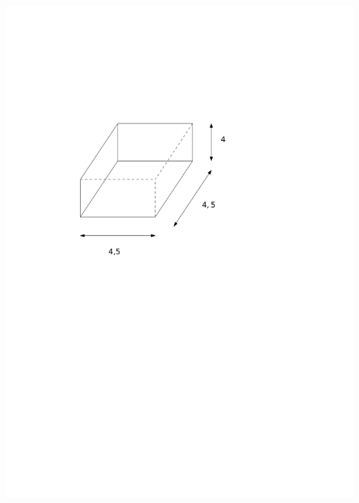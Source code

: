 \documentclass[a4paper,11pt]{report}
\begin{document}
\begin{exo}
{\begin{tasks}[after-item-skip = 0em]
    \task ~\\ \includegraphics[scale=0.5]{media/gm-02/pave2.pdf}

\end{tasks}}
\end{exo}
\end{document}
